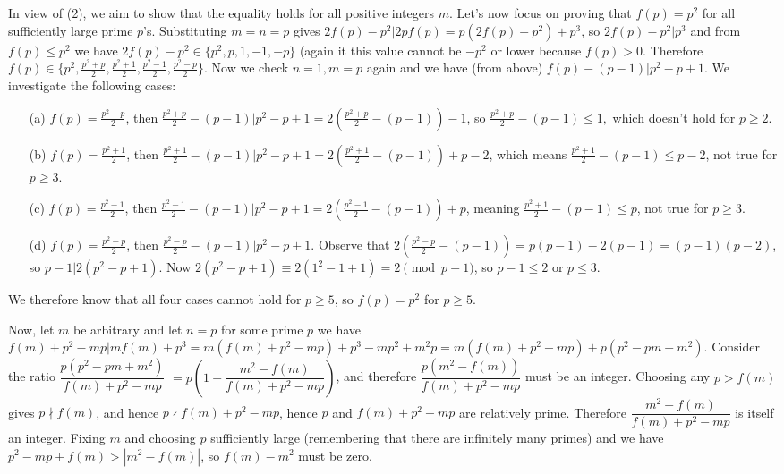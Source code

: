 \documentclass[11pt,a4paper]{article}
\begin{document}
\begin{itemize}
In view of (2), we aim to show that the equality holds for all positive integers $m$. Let's now focus on proving that $f(p)=p^2$ for all sufficiently large prime $p$'s. 
Substituting $m=n=p$ gives $2f(p)-p^2|2pf(p)=p(2f(p)-p^2)+p^3$, so 
$2f(p)-p^2|p^3$ and from $f(p)\le p^2$ we have 
$2f(p)-p^2\in\{p^2, p, 1, -1, -p\}$ (again it this value cannot be $-p^2$ or lower because $f(p)>0$. 
Therefore $f(p)\in\{p^2, \frac{p^2+p}2, \frac{p^2+1}2, \frac{p^2-1}2, \frac{p^2-p}2\}$. 
Now we check $n=1, m=p$ again and we have (from above) $f(p)-(p-1)|p^2-p+1$. 
We investigate the following cases: 
\begin{itemize}
\item [(a)] $f(p)=\frac{p^2+p}2$, 
then $\frac{p^2+p}2-(p-1)|p^2-p+1=2(\frac{p^2+p}2-(p-1))-1$, 
so $\frac{p^2+p}2-(p-1)\le 1, $
which doesn't hold for $p\ge 2$. 

\item [(b)] $f(p)=\frac{p^2+1}2$, 
then $\frac{p^2+1}2-(p-1)|p^2-p+1=2(\frac{p^2+1}2-(p-1))+p-2$, 
which means $\frac{p^2+1}2-(p-1)\le p-2$, not true for $p\ge 3$. 

\item [(c)] $f(p)=\frac{p^2-1}2$, 
then $\frac{p^2-1}2-(p-1)|p^2-p+1=2(\frac{p^2-1}2-(p-1))+p$, 
meaning  $\frac{p^2+1}2-(p-1)\le p$, not true for $p\ge 3$. 

\item [(d)] $f(p)=\frac{p^2-p}2$, 
then $\frac{p^2-p}2-(p-1)|p^2-p+1$. 
Observe that $2(\frac{p^2-p}2-(p-1))=p(p-1)-2(p-1)=(p-1)(p-2)$, 
so $p-1|2(p^2-p+1)$. Now $2(p^2-p+1)\equiv 2(1^2-1+1)=2\pmod{p-1}$, 
so $p-1\le 2$ or $p\le 3$. 
\end{itemize}
We therefore know that all four cases cannot hold for $p\ge 5$, so $f(p)=p^2$ for $p\ge 5$. 

Now, let $m$ be arbitrary and let $n=p$ for some prime $p$ we have 
$f(m)+p^2-mp|mf(m)+p^3=m(f(m)+p^2-mp)+p^3-mp^2+m^2p=m(f(m)+p^2-mp)+p(p^2-pm+m^2)$. 
Consider the ratio $\dfrac{p(p^2-pm+m^2)}{f(m)+p^2-mp}$
$=p\left(1+\dfrac{m^2-f(m)}{f(m)+p^2-mp}\right)$, 
and therefore $\dfrac{p(m^2-f(m))}{f(m)+p^2-mp}$
must be an integer. 
Choosing any $p>f(m)$ gives 
$p\nmid f(m)$, and hence $p\nmid f(m)+p^2-mp$, hence $p$ and $f(m)+p^2-mp$ are relatively prime. 
Therefore $\dfrac{m^2-f(m)}{f(m)+p^2-mp}$ is itself an integer. 
Fixing $m$ and choosing $p$ sufficiently large (remembering that there are infinitely many primes) and we have $p^2-mp+f(m)>|m^2-f(m)|$, so $f(m)-m^2$ must be zero. 

\end{itemize}
\end{document}
